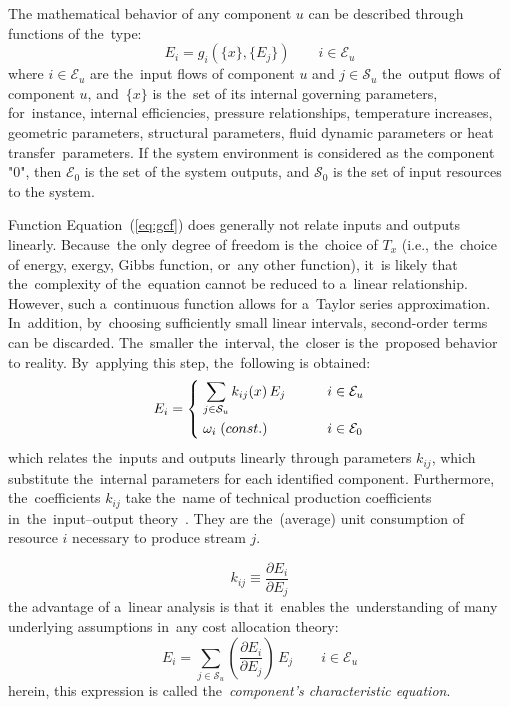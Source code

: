 \documentclass[energies,article,accept,moreauthors,pdftex]{Definitions/mdpi}
\newcommand{\dpartial}[2]{\left(\dfrac{\partial E_{#1}}{\partial E_{#2}}\right)}
\begin{document}
The mathematical behavior of any component $u$ can be described through functions of the~type:
\begin{equation}
    \label{eq:gcf}
    E_i=g_i\left(\{x\},\{E_j\}\right) \qquad i\in\mathcal{E}_u
\end{equation}
where $i\in\mathcal{E}_u$ are the~input flows of component $u$ and $j\in\mathcal{S}_u$ the~output flows of component $u$, and~$\{x\}$ is the~set of its internal governing parameters, for~instance, internal efficiencies, pressure relationships, temperature increases, geometric parameters, structural parameters, fluid dynamic parameters or heat transfer~parameters. If the system environment is considered as the component "0", then $\mathcal{E}_0$ is the set of the system outputs, and $\mathcal{S}_0$ is the set of input resources to the system.

Function Equation~(\ref{eq:gcf}) does generally not relate inputs and outputs linearly. Because~the only degree of freedom is the~choice of $T_x$ (i.e., the~choice of energy, exergy, Gibbs function, or~any other function), it~is likely that the~complexity of the~equation cannot be reduced to a~linear relationship.
However, such a~continuous function allows for a~Taylor series approximation. In~addition, by~choosing sufficiently small linear intervals, second-order terms can be discarded. The~smaller the~interval, the~closer is the~proposed behavior to reality. By~applying this step, the~following is obtained:
\begin{equation}
    E_i=\begin{dcases}
    \;\sum\limits_{j\in\mathcal{S}_u}{k_{ij}(x)\,E_j} \qquad &i\in\mathcal{E}_u \\
    \;\omega_i\;\text(const.) \qquad &i\in\mathcal{E}_0
    \end{dcases}
    \label{eq:echar}
\end{equation}
which relates the~inputs and outputs linearly through parameters $k_{ij}$, which substitute the~internal parameters for each identified component. Furthermore, the~coefficients $k_{ij}$ take the~name of technical production coefficients in~the~input–output theory~\cite{Leontief1970}. They are the~(average) unit consumption of resource $i$ necessary to produce stream $j$.

\begin{equation}
    k_{ij}\equiv\dfrac{\partial E_{i}}{\partial E_{j}}
\end{equation}
the advantage of a~linear analysis is that it~enables the~understanding of many underlying assumptions in~any cost allocation theory:
\begin{equation}
    E_i=\sum_{j\in\mathcal{S}_u}{\dpartial{i}{j}\,E_j} \qquad i\in\mathcal{E}_u
    \label{eq:deqchar}
\end{equation}
herein, this expression is called the~\emph{component's characteristic equation}.
\end{document}
